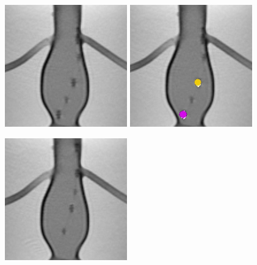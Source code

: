 \documentclass[conference]{IEEEtran}
\begin{document}
\begin{figure}[ht]
    \centering
    \begin{minipage}[t]{0.49\textwidth}
        \centering
        \includegraphics[width=0.49\linewidth]{Conference/img/tracking-websocket-start.jpg}
        \vspace{0.1cm}
        \includegraphics[width=0.49\linewidth]{Conference/img/tracking-websocket-tracks-start.jpg}
    \end{minipage}
    \begin{minipage}[t]{0.49\textwidth}
        \centering
        \includegraphics[width=0.49\linewidth]{Conference/img/tracking-websocket-end.jpg}

\end{minipage}
\end{figure}
\end{document}
